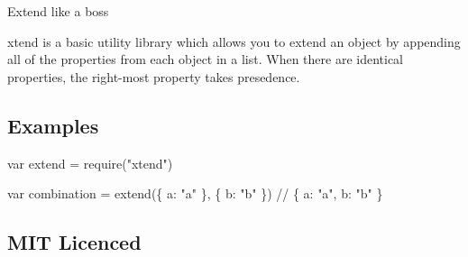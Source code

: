 \href{http://ci.testling.com/Raynos/xtend}{\tt }

Extend like a boss

xtend is a basic utility library which allows you to extend an object by appending all of the properties from each object in a list. When there are identical properties, the right-\/most property takes presedence.

\subsection*{Examples}


\begin{DoxyCode}
var extend = require("xtend")

var combination = extend(\{
    a: "a"
\}, \{
    b: "b"
\})
// \{ a: "a", b: "b" \}
\end{DoxyCode}


\subsection*{M\+IT Licenced}